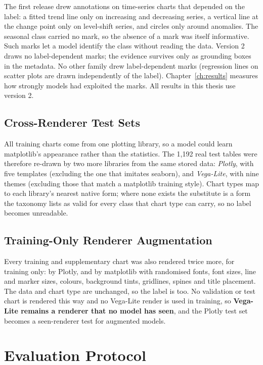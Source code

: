 The first release drew annotations on time-series charts that depended on the label:
a fitted trend line only on increasing and decreasing series, a vertical line at the
change point only on level-shift series, and circles only around anomalies. The
seasonal class carried no mark, so the absence of a mark was itself informative. Such
marks let a model identify the class without reading the data. Version 2 draws no
label-dependent marks; the evidence survives only as grounding boxes in the metadata.
No other family drew label-dependent marks (regression lines on scatter plots are drawn
independently of the label). Chapter~\ref{ch:results} measures how strongly models had
exploited the marks. All results in this thesis use version 2.

\subsection{Cross-Renderer Test Sets}

All training charts come from one plotting library, so a model could learn
matplotlib's appearance rather than the statistics. The 1{,}192 real test tables were
therefore re-drawn by two more libraries from the same stored data:
\emph{Plotly}, with five templates (excluding the one that imitates seaborn), and
\emph{Vega-Lite}, with nine themes (excluding those that match a matplotlib training
style). Chart types map to each library's nearest native form; where none exists the
substitute is a form the taxonomy lists as valid for every class that chart type can
carry, so no label becomes unreadable.

\subsection{Training-Only Renderer Augmentation}

Every training and supplementary chart was also rendered twice more, for training
only: by Plotly, and by matplotlib with randomised fonts, font sizes, line and marker
sizes, colours, background tints, gridlines, spines and title placement. The data and
chart type are unchanged, so the label is too. No validation or test chart is rendered
this way and no Vega-Lite render is used in training, so \textbf{Vega-Lite remains a
renderer that no model has seen}, and the Plotly test set becomes a seen-renderer test
for augmented models.

\section{Evaluation Protocol}
\label{sec:protocol}

